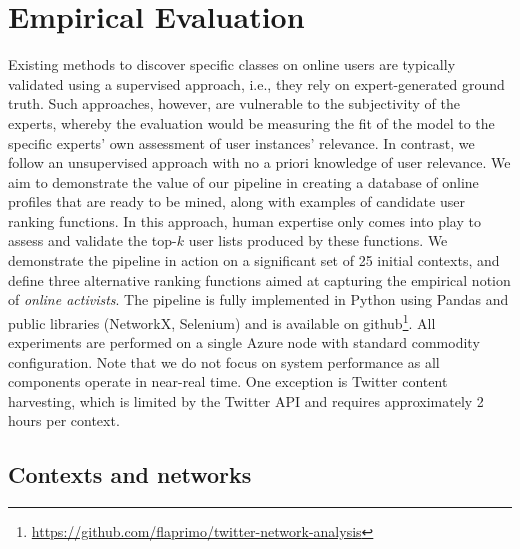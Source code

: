 \section{Empirical Evaluation} \label{sec:evaluation}

Existing methods to discover specific classes on online users are typically validated using a supervised approach, i.e., they rely on expert-generated ground truth.
Such approaches, however, are vulnerable to the subjectivity of the experts, whereby the evaluation would be measuring the fit of the model to the specific experts' own assessment of user instances' relevance. 
In contrast, we follow an unsupervised approach with no a priori knowledge of user relevance. We aim to demonstrate the value of our pipeline in creating a database of online profiles that are ready to be mined, along with examples of candidate user ranking functions.
In this approach, human expertise only comes into play to assess and validate the top-$k$ user lists produced by these functions.
%
We  demonstrate the pipeline in action on a significant set of 25 initial contexts, and define three alternative ranking functions aimed at capturing the empirical notion of  \textit{online activists}.
%
The pipeline is fully implemented in Python using Pandas and public libraries (NetworkX, Selenium) and is available on github\footnote{ \url{https://github.com/flaprimo/twitter-network-analysis}}. 
All experiments are performed on a single Azure node with standard commodity configuration.
Note that we do not focus on system performance as all components operate in near-real time. One exception is  Twitter content harvesting, which is limited by the Twitter API and requires approximately 2 hours per context.

\subsection{Contexts and networks} \label{sec:contexts-selection}
 
